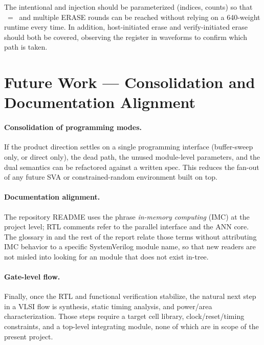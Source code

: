The intentional  and  injection
should be parameterized (indices, counts) so that
~=~ and multiple ERASE
rounds can be reached without relying on a 640-weight runtime every
time. In addition, host-initiated erase and verify-initiated erase
should both be covered, observing the 
register in waveforms to confirm which path is taken.

\section{Future Work --- Consolidation and Documentation Alignment}
\label{sec:future-next}

\paragraph{Consolidation of programming modes.}
If the product direction settles on a single programming interface
(buffer-sweep only, or direct only), the dead 
path, the unused module-level parameters, and the dual
 semantics can be refactored against a
written spec. This reduces the fan-out of any future SVA or
constrained-random environment built on top.

\paragraph{Documentation alignment.}
The repository README uses the phrase \emph{in-memory computing} (IMC)
at the project level; RTL comments refer to the parallel interface and
the ANN core. The glossary in  and the rest of
the report relate those terms without attributing IMC behavior to a
specific SystemVerilog module name, so that new readers are not misled
into looking for an  module that does not exist in-tree.

\paragraph{Gate-level flow.}
Finally, once the RTL and functional verification stabilize, the
natural next step in a VLSI flow is synthesis, static timing analysis,
and power/area characterization. Those steps require a target cell
library, clock/reset/timing constraints, and a top-level integrating
module, none of which are in scope of the present project.
